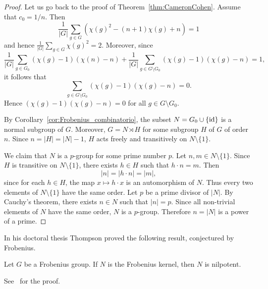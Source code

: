 \begin{proof}
    Let us go back to the proof
    of Theorem~\ref{thm:CameronCohen}. Assume that 
    $c_0=1/n$. Then
    \[
    \frac{1}{|G|}\sum_{g\in G}(\chi(g)^2-(n+1)\chi(g)+n)=1
    \]
    and hence $\frac{1}{|G|}\sum_{g\in G}\chi(g)^2=2$. Moreover, 
    since 
    \[
    \frac{1}{|G|}\sum_{g\in G_0}(\chi(g)-1)(\chi(n)-n)
    +\frac{1}{|G|}\sum_{g\in G\setminus G_0}(\chi(g)-1)(\chi(g)-n)=1,
    \]
    it follows that 
    \[
    \sum_{g\in G\setminus G_0}(\chi(g)-1)(\chi(g)-n)=0.
    \]
    Hence $(\chi(g)-1)(\chi(g)-n)=0$
    for all $g\in G\setminus G_0$. 
    
    By Corollary~\ref{cor:Frobenius_combinatorio}, 
    the subset $N=G_0\cup\{\operatorname{id}\}$ is a normal subgroup of $G$. Moreover, $G=N\rtimes H$ for some 
    subgroup $H$ of $G$ of order $n$. Since 
    $n=|H|=|N|-1$, $H$ acts freely and transitively 
    on $N\setminus\{1\}$. 

    We claim that $N$ is a $p$-group for some prime number $p$. Let $n,m\in N\setminus\{1\}$. Since $H$ is transitive on $N\setminus\{1\}$, 
    there exists $h\in H$ such that $h\cdot n=m$. Then
    \[
    |n|=|h\cdot n|=|m|,
    \]
    since for each $h\in H$, the map 
    $x\mapsto h\cdot x$ is an automorphism of $N$. Thus every two elements of $N\setminus\{1\}$ have 
    the same order. Let $p$ be a prime divisor 
    of $|N|$. By Cauchy's theorem, there exists 
    $n\in N$ such that $|n|=p$. Since all non-trivial
    elements of $N$ have the same order, 
    $N$ is a $p$-group. Therefore 
    $n=|N|$ is a power of a prime.
\end{proof}

In his doctoral thesis Thompson proved the following result, conjectured
by Frobenius. 

\begin{theorem}[Thompson]
    Let $G$ be a Frobenius group. If $N$ is the Frobenius kernel, then $N$ 
    is nilpotent.
\end{theorem}

See~\cite[Theorem 6.24]{MR2426855} for the proof.

